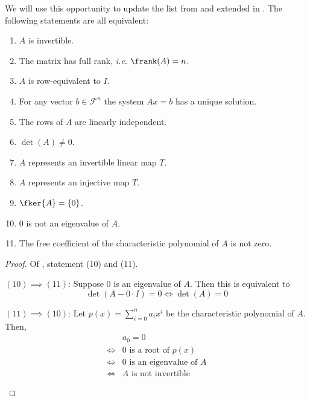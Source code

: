 \begin{rem}\label{thm-square-matrix-properties-new-extended}
	We will use this opportunity to update the list from 
	and extended in . The following statements are
	all equivalent:
	\begin{enumerate}
		\item $A$ is invertible.
		\item The matrix has full rank, \textit{i.e.} $\frank(A)=n$.
		\item $A$ is row-equivalent to $I$.
		\item For any vector $b\in\mathcal{F}^n$ the system $Ax=b$ has a unique solution.
		\item The rows of $A$ are linearly independent.
		\item $\det(A)\neq0$.
		\item $A$ represents an invertible linear map $T$.
		\item $A$ represents an injective map $T$.
		\item $\fker{A}=\{0\}$.
		\item $0$ is not an eigenvalue of $A$.
		\item The free coefficient of the characteristic polynomial of $A$ is not zero.
	\end{enumerate}
\end{rem}

\begin{proof}
	Of , statement (10) and (11).
	\begin{flushleft}
		$(10)\implies(11)$: Suppose $0$ is an eigenvalue of $A$. Then this is equivalent to
		\begin{equation*}
			\det(A - 0\cdot I) = 0 \Leftrightarrow \det(A)=0
		\end{equation*}
	\end{flushleft}
	\begin{flushleft}
		$(11)\implies(10)$: Let $p(x)=\sum_{i=0}^n a_i x^i$ be the characteristic polynomial of $A$.
		Then,
		\begin{align*}
			 & a_0 = 0                        \\
			\Leftrightarrow
			 & 0\text{ is a root of }p(x)     \\
			\Leftrightarrow
			 & 0\text{ is an eigenvalue of }A \\
			\Leftrightarrow
			 & A\text{ is not invertible}
		\end{align*}
	\end{flushleft}
\end{proof}

